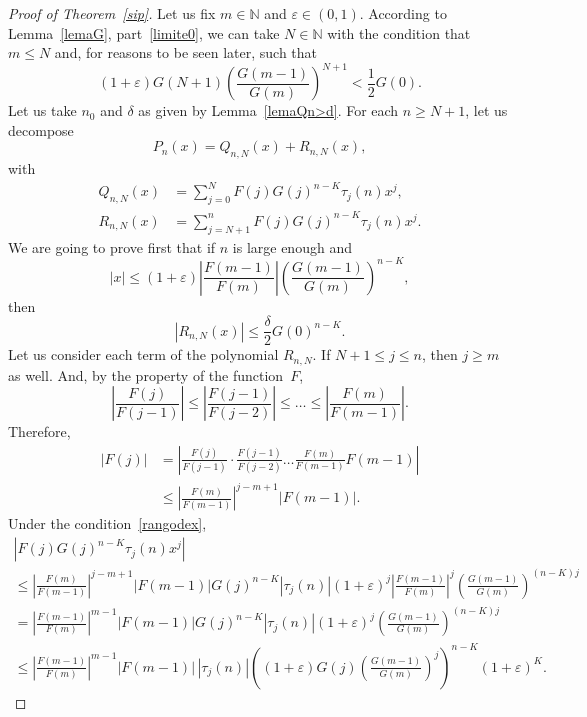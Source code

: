 \documentclass[10pt, a4paper, leqno]{amsart}
\numberwithin{equation}{section}
\theoremstyle{plain}
\theoremstyle{remark}
\newcommand{\NN}{\mathbb{N}}
\newcommand{\eps}{\varepsilon}
\begin{document}
\begin{proof}[Proof of Theorem~\ref{sip}]
Let us fix $m \in \NN$ and $\eps \in (0,1)$. According to Lemma~\ref{lemaG}, part~\eqref{limite0}, we can take $N \in \NN$ with the condition that $m \le N$ and, for reasons to be seen later, such that
\begin{equation}
\label{menorque12}
  (1+\eps) G(N+1)
  \left(\frac{G(m-1)}{G(m)}\right)^{N+1}
  < \frac{1}{2} G(0).
\end{equation}
Let us take $n_0$ and $\delta$ as given by Lemma~\ref{lemaQn>d}.
For each $n \ge N+1$, let us decompose
\[
  P_n(x) = Q_{n,N}(x) + R_{n,N}(x),
\]
with
\begin{align*}
  Q_{n,N}(x) &= \sum_{j=0}^N F(j) G(j)^{n-K} \tau_j(n) x^j,
  \\
  R_{n,N}(x) &= \sum_{j=N+1}^n F(j) G(j)^{n-K} \tau_j(n) x^j.
\end{align*}
We are going to prove first that if $n$ is large enough and
\begin{equation}
\label{rangodex}
  |x| \le (1+\eps) \left|\frac{F(m-1)}{F(m)}\right|
  \left( \frac{G(m-1)}{G(m)} \right)^{n-K},
\end{equation}
then
\[
  |R_{n,N}(x)| \le \frac{\delta}{2} G(0)^{n-K}.
\]
Let us consider each term of the polynomial $R_{n,N}$. If $N+1 \le j \le n$, then $j \ge m$ as well. And, by the property of the function~$F$,
\[
  \left|\frac{F(j)}{F(j-1)}\right|
  \le \left|\frac{F(j-1)}{F(j-2)}\right| 
  \le \dots \le \left|\frac{F(m)}{F(m-1)}\right|.
\]
Therefore,
\begin{align*}
  |F(j)|
  &= \left|\frac{F(j)}{F(j-1)} \cdot \frac{F(j-1)}{F(j-2)} \dots \frac{F(m)}{F(m-1)} F(m-1)\right|
  \\
  &\le \left| \frac{F(m)}{F(m-1)} \right|^{j-m+1} |F(m-1)|.
\end{align*}
Under the condition~\eqref{rangodex},
\begin{multline*}
  |F(j) G(j)^{n-K} \tau_j(n) x^j|
  \\
  \le \left| \frac{F(m)}{F(m-1)} \right|^{j-m+1} |F(m-1)| G(j)^{n-K} |\tau_j(n)|
  (1+\eps)^j
  \left|\frac{F(m-1)}{F(m)}\right|^j
  \left( \frac{G(m-1)}{G(m)} \right)^{(n-K)j}
  \\
  = \left| \frac{F(m-1)}{F(m)} \right|^{m-1} |F(m-1)| G(j)^{n-K} |\tau_j(n)|
  (1+\eps)^j
  \left( \frac{G(m-1)}{G(m)} \right)^{(n-K)j}
  \\
  \le \left| \frac{F(m-1)}{F(m)} \right|^{m-1} |F(m-1)| \, |\tau_j(n)|
  \left(
  (1+\eps)
  G(j)
  \left( \frac{G(m-1)}{G(m)} \right)^j
  \right)^{n-K} (1+\eps)^K.

\end{multline*}
\end{proof}
\end{document}
